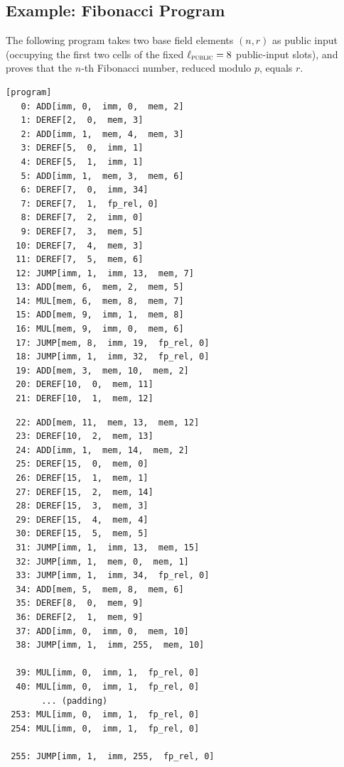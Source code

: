 \documentclass{article}
\theoremstyle{definition}
\begin{document}
\subsection{Example: Fibonacci Program}

The following program takes two base field elements $(n, r)$ as public input (occupying the first two cells of the fixed $\ell_\textsc{public} = 8$ public-input slots), and proves that the $n$-th Fibonacci number, reduced modulo $p$, equals $r$.

\begin{framed}
\small
\noindent
\begin{minipage}[t]{0.48\textwidth}
\begin{verbatim}
[program]
   0: ADD[imm, 0,  imm, 0,  mem, 2]
   1: DEREF[2,  0,  mem, 3]
   2: ADD[imm, 1,  mem, 4,  mem, 3]
   3: DEREF[5,  0,  imm, 1]
   4: DEREF[5,  1,  imm, 1]
   5: ADD[imm, 1,  mem, 3,  mem, 6]
   6: DEREF[7,  0,  imm, 34]
   7: DEREF[7,  1,  fp_rel, 0]
   8: DEREF[7,  2,  imm, 0]
   9: DEREF[7,  3,  mem, 5]
  10: DEREF[7,  4,  mem, 3]
  11: DEREF[7,  5,  mem, 6]
  12: JUMP[imm, 1,  imm, 13,  mem, 7]
  13: ADD[mem, 6,  mem, 2,  mem, 5]
  14: MUL[mem, 6,  mem, 8,  mem, 7]
  15: ADD[mem, 9,  imm, 1,  mem, 8]
  16: MUL[mem, 9,  imm, 0,  mem, 6]
  17: JUMP[mem, 8,  imm, 19,  fp_rel, 0]
  18: JUMP[imm, 1,  imm, 32,  fp_rel, 0]
  19: ADD[mem, 3,  mem, 10,  mem, 2]
  20: DEREF[10,  0,  mem, 11]
  21: DEREF[10,  1,  mem, 12]
\end{verbatim}
\end{minipage}
\hfill
\begin{minipage}[t]{0.48\textwidth}
\begin{verbatim}
  22: ADD[mem, 11,  mem, 13,  mem, 12]
  23: DEREF[10,  2,  mem, 13]
  24: ADD[imm, 1,  mem, 14,  mem, 2]
  25: DEREF[15,  0,  mem, 0]
  26: DEREF[15,  1,  mem, 1]
  27: DEREF[15,  2,  mem, 14]
  28: DEREF[15,  3,  mem, 3]
  29: DEREF[15,  4,  mem, 4]
  30: DEREF[15,  5,  mem, 5]
  31: JUMP[imm, 1,  imm, 13,  mem, 15]
  32: JUMP[imm, 1,  mem, 0,  mem, 1]
  33: JUMP[imm, 1,  imm, 34,  fp_rel, 0]
  34: ADD[mem, 5,  mem, 8,  mem, 6]
  35: DEREF[8,  0,  mem, 9]
  36: DEREF[2,  1,  mem, 9]
  37: ADD[imm, 0,  imm, 0,  mem, 10]
  38: JUMP[imm, 1,  imm, 255,  mem, 10]

  39: MUL[imm, 0,  imm, 1,  fp_rel, 0]
  40: MUL[imm, 0,  imm, 1,  fp_rel, 0]
       ... (padding)
 253: MUL[imm, 0,  imm, 1,  fp_rel, 0]
 254: MUL[imm, 0,  imm, 1,  fp_rel, 0]

 255: JUMP[imm, 1,  imm, 255,  fp_rel, 0]
\end{verbatim}
\end{minipage}
\end{framed}
\end{document}
